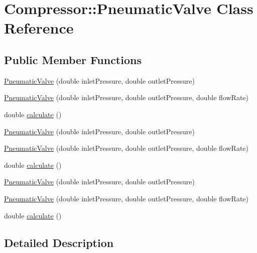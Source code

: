 \hypertarget{class_compressor_1_1_pneumatic_valve}{}\section{Compressor\+:\+:Pneumatic\+Valve Class Reference}
\label{class_compressor_1_1_pneumatic_valve}
\subsection*{Public Member Functions}
\begin{DoxyCompactItemize}
\item 
\hyperlink{class_compressor_1_1_pneumatic_valve_a8c883ff13640780f40d026984e9116f7}{Pneumatic\+Valve} (double inlet\+Pressure, double outlet\+Pressure)
\item 
\hyperlink{class_compressor_1_1_pneumatic_valve_adc3d621e933c23b13d1f20378704336b}{Pneumatic\+Valve} (double inlet\+Pressure, double outlet\+Pressure, double flow\+Rate)
\item 
double \hyperlink{class_compressor_1_1_pneumatic_valve_aa9e11ab6f1e75730519a69fccfaa53c2}{calculate} ()
\item 
\hyperlink{class_compressor_1_1_pneumatic_valve_a8c883ff13640780f40d026984e9116f7}{Pneumatic\+Valve} (double inlet\+Pressure, double outlet\+Pressure)
\item 
\hyperlink{class_compressor_1_1_pneumatic_valve_adc3d621e933c23b13d1f20378704336b}{Pneumatic\+Valve} (double inlet\+Pressure, double outlet\+Pressure, double flow\+Rate)
\item 
double \hyperlink{class_compressor_1_1_pneumatic_valve_aa9e11ab6f1e75730519a69fccfaa53c2}{calculate} ()
\item 
\hyperlink{class_compressor_1_1_pneumatic_valve_a8c883ff13640780f40d026984e9116f7}{Pneumatic\+Valve} (double inlet\+Pressure, double outlet\+Pressure)
\item 
\hyperlink{class_compressor_1_1_pneumatic_valve_adc3d621e933c23b13d1f20378704336b}{Pneumatic\+Valve} (double inlet\+Pressure, double outlet\+Pressure, double flow\+Rate)
\item 
double \hyperlink{class_compressor_1_1_pneumatic_valve_aa9e11ab6f1e75730519a69fccfaa53c2}{calculate} ()
\end{DoxyCompactItemize}


\subsection{Detailed Description}


